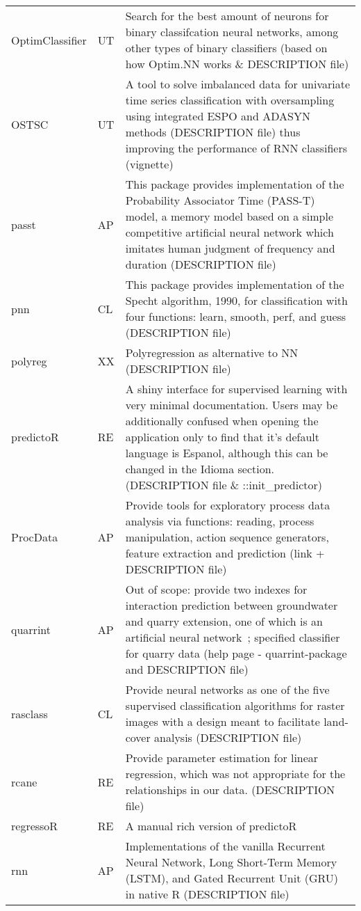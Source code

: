 \begin{Schunk}
\begin{longtable}[t]{ll>{\raggedright\arraybackslash}p{10cm}}
\addlinespace
OptimClassifier & UT & Search for the best amount of neurons for binary classifcation neural networks, among other types of binary classifiers (based on how Optim.NN works \& DESCRIPTION file)\\
OSTSC & UT & A tool to solve imbalanced data for univariate time series classification with oversampling using integrated ESPO and ADASYN methods (DESCRIPTION file) thus improving the performance of RNN classifiers (vignette)\\
passt & AP & This package provides implementation of the Probability Associator Time (PASS-T) model, a memory model based on a simple competitive artificial neural network which imitates human judgment of frequency and duration (DESCRIPTION file)\\
pnn & CL & This package provides implementation of the Specht algorithm, 1990, for classification with four functions: learn, smooth, perf, and guess (DESCRIPTION file)\\
polyreg & XX & Polyregression as alternative to NN (DESCRIPTION file)\\
\addlinespace
predictoR & RE & A shiny interface for supervised learning with very minimal documentation. Users may be additionally confused when opening the application only to find that it's default language is Espanol, although this can be changed in the Idioma section. (DESCRIPTION file \& ::init\_predictor)\\
ProcData & AP & Provide tools for exploratory process data analysis via functions: reading, process manipulation, action sequence generators, feature extraction and prediction (link + DESCRIPTION file)\\
quarrint & AP & Out of scope: provide two indexes for interaction prediction between groundwater and quarry extension, one of which is an artificial neural network ; specified classifier for quarry data (help page - quarrint-package and DESCRIPTION file)\\
rasclass & CL & Provide neural networks as one of the five supervised classification algorithms for raster images with a design meant to facilitate land-cover analysis (DESCRIPTION file)\\
rcane & RE & Provide parameter estimation for linear regression, which was not appropriate for the relationships in our data. (DESCRIPTION file)\\
\addlinespace
regressoR & RE & A manual rich version of predictoR\\
rnn & AP & Implementations of the vanilla Recurrent Neural Network, Long Short-Term Memory (LSTM), and Gated Recurrent Unit (GRU) in native R (DESCRIPTION file)\\

\end{longtable}
\end{Schunk}
